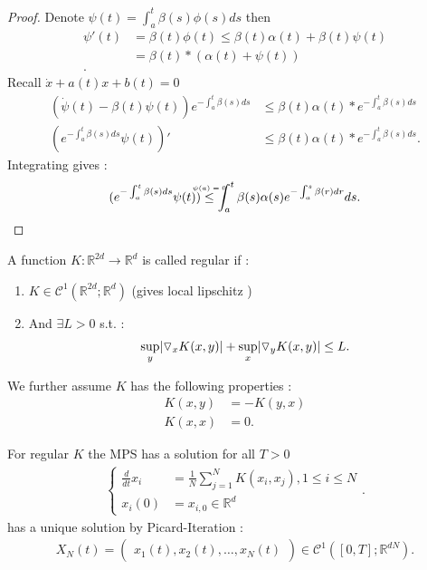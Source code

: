 \begin{proof}[Proof]
  Denote $\psi(t) = \int_a^{t} \beta(s) \phi(s) ds $ then 
  \begin{align*}
    \psi'(t) &= \beta(t)\phi(t) \le \beta(t)\alpha(t) + \beta(t)\psi(t) \\
             &= \beta(t) * (\alpha(t) + \psi(t))\\
  .\end{align*}
  Recall $\dot{x} + a(t)x + b(t) = 0$
  \begin{align*}
    (\dot{\psi}(t) - \beta(t)\psi(t) )e^{- \int_a^{t}\beta(s) ds } &\le  \beta(t)\alpha(t)*e^{-\int_a^{t} \beta(s) ds } \\
    (e^{- \int_a^{t}\beta(s) ds } \psi(t))' &\le \beta(t) \alpha(t)*e^{-\int_a^{t} \beta(s) ds } 
  .\end{align*}
  Integrating gives : 
  \begin{align*}
    (e^{- \int_a^{t}\beta(s) ds } \psi(t)) \myS{$\psi(a) =0$}{\le } \int_a^{t} \beta(s) \alpha(s) e^{-\int_a^{s}\beta(r) dr } ds  
  .\end{align*}
\end{proof}
\begin{definition}[Regularity]\label{regularity}
  A function $K : \mathbb{R}^{2d} \to \mathbb{R}^{d}  $ is called regular if :
  \begin{enumerate}
    \item $K \in  \mathcal{C}^{1}(\mathbb{R}^{2d};\mathbb{R}^{d}  ) $ (gives local lipschitz ) 
    \item And $\exists  L >0 $ s.t. : 
      \begin{align*}
        \sup_{y} \lvert\triangledown_x K(x,y) \rvert + \sup_{x} \lvert\triangledown_y K(x,y)\rvert  \le L
      .\end{align*}
  \end{enumerate} 
\end{definition}
\begin{remark}
We further assume $K$ has the following properties :
  \begin{align*}
  K(x,y) &= -K(y,x) \tag{antisymmetric}\\
    K(x,x) &= 0 
.\end{align*}
\end{remark}
 \begin{theorem}
 For regular $K$ the MPS has a solution for all $T>0$
\begin{align*}
  \begin{cases}
    \frac{d}{dt} x_i &= \frac{1}{N} \sum_{j=1}^{N} K(x_i,x_j) ,  1\le i \le N \\ 
    x_i(0)  &= x_{i,0} \in \mathbb{R}^{d} 
  \end{cases}
 .\end{align*}
 has a unique solution by Picard-Iteration : 
 \begin{align*}
   X_N(t) = \begin{pmatrix} x_1(t),x_2(t),\ldots ,x_N(t) \end{pmatrix}  \in \mathcal{C}^{1}([0,T];\mathbb{R}^{dN} ) 
 .\end{align*}
 \end{theorem}

